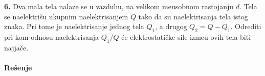 \clearpage
\textbf{\Large 6.} Dva mala tela nalaze se u vazduhu, na velikom me\dj{}usobnom rastojanju $d$. Tela se naelektri\v{s}u ukupnim naelektrisanjem $Q$ tako da su naelektrisanja tela istog znaka. Pri tome je naelektrisanje jednog tela $Q_1$, a drugog $Q_2 = Q-Q_1$. Odrediti pri kom odnosu naelektrisanja $Q_1 / Q$ \'{c}e elektrostati\v{c}ke sile izme\dj{}u ovih tela biti najja\v{c}e.
\\\\
\textbf{\Large Re\v{s}enje}
